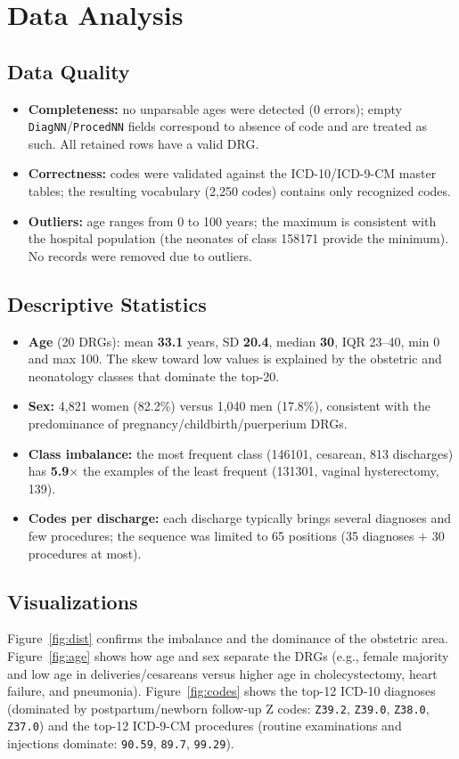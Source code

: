 \documentclass{ieeeaccess}
\begin{document}
\section{Data Analysis}
\label{sec:analysis}
\subsection{Data Quality}
\label{sec:quality}
\begin{itemize}
  \item \textbf{Completeness:} no unparsable ages were detected (0 errors); empty \texttt{DiagNN}/\texttt{ProcedNN} fields correspond to absence of code and are treated as such. All retained rows have a valid DRG.
  \item \textbf{Correctness:} codes were validated against the ICD-10/ICD-9-CM master tables; the resulting vocabulary (2,250 codes) contains only recognized codes.
  \item \textbf{Outliers:} age ranges from 0 to 100 years; the maximum is consistent with the hospital population (the neonates of class 158171 provide the minimum). No records were removed due to outliers.
\end{itemize}

\subsection{Descriptive Statistics}
\label{sec:descriptive}
\begin{itemize}
  \item \textbf{Age} (20 DRGs): mean \textbf{33.1} years, SD \textbf{20.4}, median \textbf{30}, IQR 23--40, min 0 and max 100. The skew toward low values is explained by the obstetric and neonatology classes that dominate the top-20.
  \item \textbf{Sex:} 4,821 women (82.2\%) versus 1,040 men (17.8\%), consistent with the predominance of pregnancy/childbirth/puerperium DRGs.
  \item \textbf{Class imbalance:} the most frequent class (146101, cesarean, 813 discharges) has \textbf{5.9$\times$} the examples of the least frequent (131301, vaginal hysterectomy, 139).
  \item \textbf{Codes per discharge:} each discharge typically brings several diagnoses and few procedures; the sequence was limited to 65 positions (35 diagnoses $+$ 30 procedures at most).
\end{itemize}

\subsection{Visualizations}
\label{sec:visual}
Figure~\ref{fig:dist} confirms the imbalance and the dominance of the obstetric area. Figure~\ref{fig:age} shows how age and sex separate the DRGs (e.g., female majority and low age in deliveries/cesareans versus higher age in cholecystectomy, heart failure, and pneumonia). Figure~\ref{fig:codes} shows the top-12 ICD-10 diagnoses (dominated by postpartum/newborn follow-up Z codes: \texttt{Z39.2}, \texttt{Z39.0}, \texttt{Z38.0}, \texttt{Z37.0}) and the top-12 ICD-9-CM procedures (routine examinations and injections dominate: \texttt{90.59}, \texttt{89.7}, \texttt{99.29}).
\end{document}
